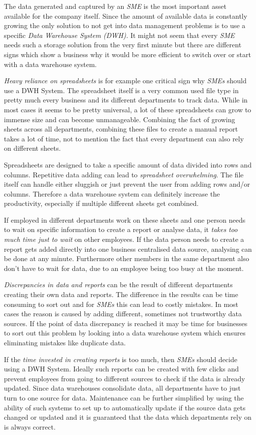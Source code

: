 \documentclass[../paper.tex]{subfiles}
\begin{document}
The data generated and captured by an \textit{SME} is the most important asset available for the company itself. Since the amount of available
data is constantly growing the only solution to not get into data management problems is to use a specific \textit{Data Warehouse System (DWH).}
It might not seem that every \textit{SME} needs such a storage solution from the very first minute but there are different signs which show a business
why it would be more efficient to switch over or start with a data warehouse system.

\textit{Heavy reliance on spreadsheets} is for example one critical sign why \textit{SMEs} should use a DWH System. The spreadsheet itself is a very
common used file type in pretty much every business and its different departments to track data. While in most cases it seems to be pretty universal,
a lot of these spreadsheets can grow to immense size and can become unmanageable. Combining the fact of growing sheets across all departments, combining
these files to create a manual report takes a lot of time, not to mention the fact that every department can also rely on different sheets.

Spreadsheets are designed to take a specific amount of data divided into rows and columns. Repetitive data adding can lead to
\textit{spreadsheet overwhelming}. The file itself can handle either sluggish or just prevent the user from adding rows and/or columns. Therefore a
data warehouse system can definitely increase the productivity, especially if multiple different sheets get combined.

If employed in different departments work on these sheets and one person needs to wait on specific information to create a report or 
analyse data, it \textit{takes too much time just to wait} on other employees. If the data person needs to create a report gets added directly into one
business centralised data source, analysing can be done at any minute. Furthermore other members in the same department also don't have to wait for
data, due to an employee being too busy at the moment.

\textit{Discrepancies in data and reports} can be the result of different departments creating their own data and reports. The difference in the results
can be time consuming to sort out and for \textit{SMEs} this can lead to costly mistakes. In most cases the reason is caused by adding different,
sometimes not trustworthy data sources. If the point of data discrepancy is reached it may be time for businesses to sort out this problem by looking
into a data warehouse system which ensures eliminating mistakes like duplicate data.

If the \textit{time invested in creating reports} is too much, then \textit{SMEs} should decide using a DWH System. Ideally such reports can be created
with few clicks and prevent employees from going to different sources to check if the data is already updated. Since data warehouses consolidate data,
all departments have to just turn to one source for data. Maintenance can be further simplified by using the ability of such systems to set up to
automatically update if the source data gets changed or updated and it is guaranteed that the data which departments rely on is always correct.
\end{document}
